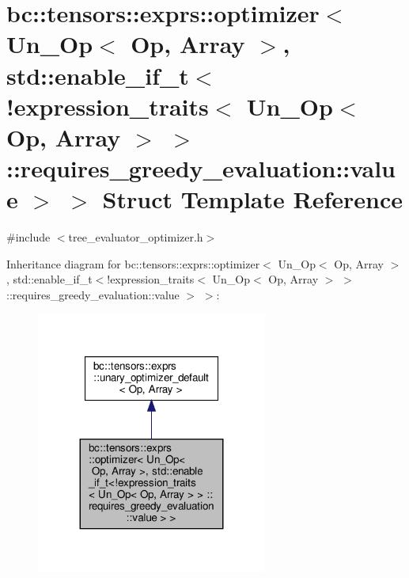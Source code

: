 \hypertarget{structbc_1_1tensors_1_1exprs_1_1optimizer_3_01Un__Op_3_01Op_00_01Array_01_4_00_01std_1_1enable__66b812e276696f18c9c03b5fec72f8f7}{}\section{bc\+:\+:tensors\+:\+:exprs\+:\+:optimizer$<$ Un\+\_\+\+Op$<$ Op, Array $>$, std\+:\+:enable\+\_\+if\+\_\+t$<$!expression\+\_\+traits$<$ Un\+\_\+\+Op$<$ Op, Array $>$ $>$ \+:\+:requires\+\_\+greedy\+\_\+evaluation\+:\+:value $>$ $>$ Struct Template Reference}
\label{structbc_1_1tensors_1_1exprs_1_1optimizer_3_01Un__Op_3_01Op_00_01Array_01_4_00_01std_1_1enable__66b812e276696f18c9c03b5fec72f8f7}


{\ttfamily \#include $<$tree\+\_\+evaluator\+\_\+optimizer.\+h$>$}



Inheritance diagram for bc\+:\+:tensors\+:\+:exprs\+:\+:optimizer$<$ Un\+\_\+\+Op$<$ Op, Array $>$, std\+:\+:enable\+\_\+if\+\_\+t$<$!expression\+\_\+traits$<$ Un\+\_\+\+Op$<$ Op, Array $>$ $>$ \+:\+:requires\+\_\+greedy\+\_\+evaluation\+:\+:value $>$ $>$\+:\nopagebreak
\begin{figure}[H]
\begin{center}
\leavevmode
\includegraphics[width=215pt]{structbc_1_1tensors_1_1exprs_1_1optimizer_3_01Un__Op_3_01Op_00_01Array_01_4_00_01std_1_1enable__6672a8028d6d68124b6c951160489c7a}
\end{center}
\end{figure}


